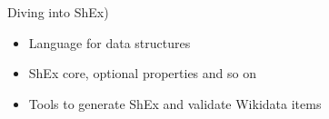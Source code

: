 \documentclass{beamer}
\begin{document}
\begin{frame}{Diving into ShEx)}
\begin{itemize}
    \item Language for data structures
    \item ShEx core, optional properties and so on
    \item Tools to generate ShEx and validate Wikidata items
\end{itemize}
\end{frame}


\begin{frame}
  \titlepage
\end{frame}
\end{document}
